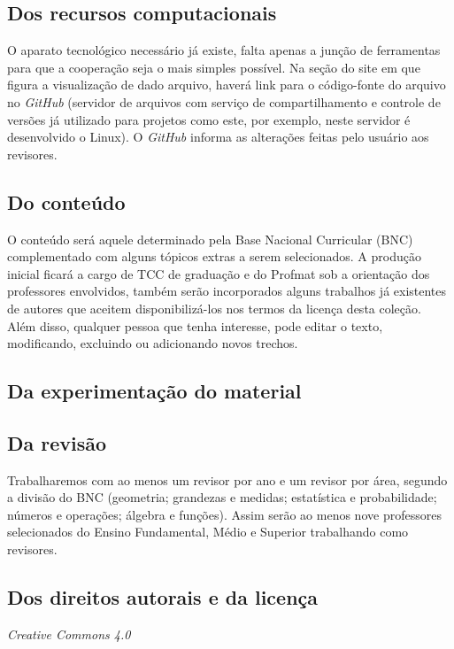 \documentclass[10 pt]{article}
\begin{document}
\subsection{Dos recursos computacionais}
O aparato tecnológico necessário já existe, falta apenas a junção de ferramentas para que a cooperação seja o mais simples possível. Na seção do site em que figura a visualização de dado arquivo, haverá link para o código-fonte do arquivo no {\it GitHub} (servidor de arquivos com serviço de compartilhamento e controle de versões já utilizado para projetos como este, por exemplo, neste servidor é desenvolvido o Linux). O {\it GitHub} informa as alterações feitas pelo usuário aos revisores.

\subsection{Do conteúdo}
O conteúdo será aquele determinado pela Base Nacional Curricular (BNC) complementado com alguns tópicos extras a serem selecionados. A produção inicial ficará a cargo de TCC de graduação e do Profmat sob a orientação dos professores envolvidos, também serão incorporados alguns trabalhos já existentes de autores que aceitem disponibilizá-los nos termos da licença desta coleção. Além disso, qualquer pessoa que tenha interesse, pode  editar o texto, modificando, excluindo ou adicionando novos trechos.

\subsection{Da experimentação do material}


\subsection{Da revisão}
Trabalharemos com ao menos um revisor por ano e um revisor por área, segundo a divisão do BNC (geometria; grandezas e medidas; estatística e probabilidade; números e operações; álgebra e funções). Assim serão ao menos nove professores selecionados do Ensino Fundamental, Médio e Superior trabalhando como revisores.


\subsection{Dos direitos autorais e da licença}
 
 {\it Creative Commons 4.0} %
 
\end{document}

